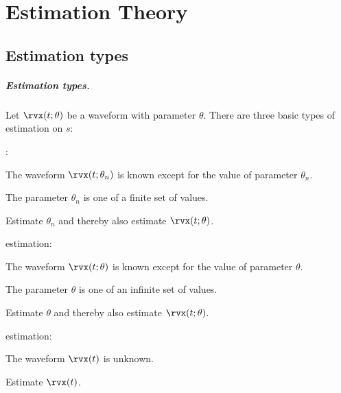 
\chapter{Estimation Theory }
\label{app:est}
\section{Estimation types}
\paragraph{Estimation types.}
Let $\rvx(t;\theta)$ be a waveform with parameter $\theta$.
There are three basic types of estimation on $s$:

\begin{enume}
   \item {}:
      \begin{liste}
         \item The waveform $\rvx(t;\theta_n)$ is known except for the value of parameter $\theta_n$.
         \item The parameter $\theta_n$ is one of a finite set of values.
         \item Estimate $\theta_n$ and thereby also estimate $\rvx(t;\theta)$.
      \end{liste}
   \item {} estimation:
      \begin{liste}
         \item The waveform $\rvx(t;\theta)$ is known except for the value of parameter $\theta$.
         \item The parameter $\theta$ is one of an infinite set of values.
         \item Estimate $\theta$ and thereby also estimate $\rvx(t;\theta)$.
      \end{liste}
   \item {} estimation:
      \begin{liste}
         \item The waveform $\rvx(t)$ is unknown.
         \item Estimate $\rvx(t)$.
      \end{liste}
\end{enume}

